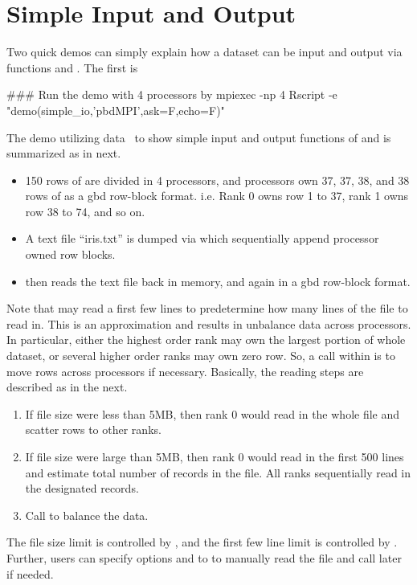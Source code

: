 
\section[Simple Input and Output]{Simple Input and Output}
\label{sec:simple_io}

Two quick demos can simply explain how a dataset can be input and output
via  functions  and
. The first is
\begin{Command}
### Run the demo with 4 processors by
mpiexec -np 4 Rscript -e "demo(simple_io,'pbdMPI',ask=F,echo=F)"
\end{Command}
The demo utilizing  data~\citep{Fisher1936} to show simple input
and output functions of  and is summarized as in next.
\begin{itemize}
\item 150 rows of  are divided in 4 processors, and processors
      own 37, 37, 38, and 38 rows of  as a gbd row-block format.
      i.e. Rank 0 owns row 1 to 37, rank 1 owns row 38 to 74, and so on.
\item A text file ``iris.txt'' is dumped via  which
      sequentially append processor owned row blocks.
\item {} then reads the text file back in memory, and
      again in a gbd row-block format.
\end{itemize}

Note that  may read a first few lines to predetermine
how many lines of the file to read in. This is an approximation and results
in unbalance data across processors. In particular, either the highest order
rank may own the largest portion of whole dataset, or several higher order
ranks may own zero row. So, a call
 within 
is to move rows across processors if necessary.
Basically, the reading steps are described as in the next.
\begin{enumerate}
\item If file size were less than 5MB, then rank 0 would read in the whole file
      and scatter rows to other ranks.
\item If file size were large than 5MB, then rank 0 would read in the first
      500 lines and estimate total number of records in the file. All ranks
      sequentially read in the designated records.    
\item Call  to balance the data.
\end{enumerate}
The file size limit is controlled by , and
the first few line limit is controlled by .
Further, users can specify options  and  to
 to manually read the file and call
 later if needed.

